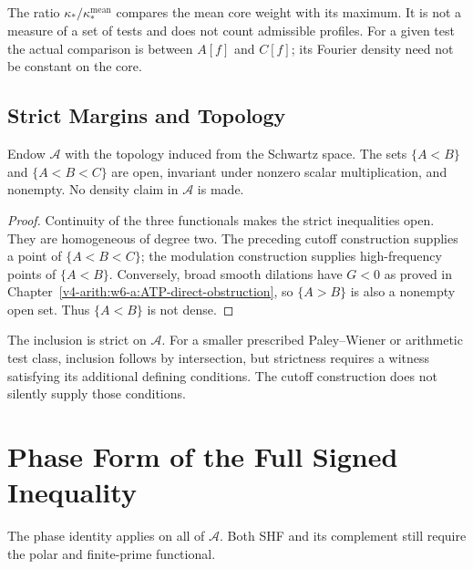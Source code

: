 \begin{remark}
\label{v4-arith:w7-a:rem:factor-2-enlargement}
The ratio \(\kappa_*/\kappa_*^{\mathrm{mean}}\) compares the mean
core weight with its maximum. It is not a measure of a set of tests
and does not count admissible profiles. For a given test the actual
comparison is between \(A[f]\) and \(C[f]\); its Fourier density
need not be constant on the core.
\end{remark}

\subsection{Strict Margins and Topology}
\label{v4-arith:w7-a:SHF-class:density}
\begin{proposition}
\label{v4-arith:w7-a:prop:SHF-nonempty}
Endow \(\mathscr A\) with the topology induced from the Schwartz
space. The sets \(\{A<B\}\) and \(\{A<B<C\}\) are open, invariant
under nonzero scalar multiplication, and nonempty. No density
claim in \(\mathscr A\) is made.
\end{proposition}
\begin{proof}
Continuity of the three functionals makes the strict inequalities
open. They are homogeneous of degree two. The preceding cutoff
construction supplies a point of \(\{A<B<C\}\); the modulation
construction supplies high-frequency points of \(\{A<B\}\).
Conversely, broad smooth dilations have \(G<0\) as proved in
Chapter~\ref{v4-arith:w6-a:ATP-direct-obstruction}, so \(\{A>B\}\)
is also a nonempty open set. Thus \(\{A<B\}\) is not dense.
\end{proof}

\begin{remark}
\label{v4-arith:w7-a:rem:SHF-strictly-larger}
The inclusion is strict on \(\mathscr A\). For a smaller prescribed
Paley--Wiener or arithmetic test class, inclusion follows by
intersection, but strictness requires a witness satisfying its
additional defining conditions. The cutoff construction does not
silently supply those conditions.
\end{remark}

\section{Phase Form of the Full Signed Inequality}
\label{v4-arith:w7-a:Z-reformulation}
The phase identity applies on all of \(\mathscr A\). Both SHF and
its complement still require the polar and finite-prime functional.

